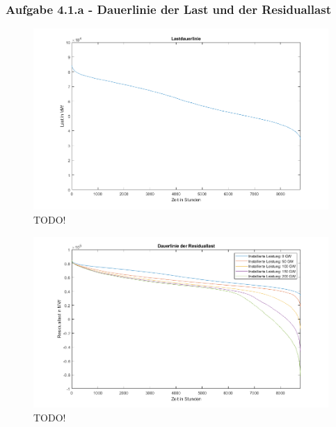 \documentclass[a4paper,12pt]{article}
\begin{document}
	\subsubsection{Aufgabe 4.1.a - Dauerlinie der Last und der Residuallast}
	\begin{figure}[H]
		\centering
		\includegraphics[width=12cm]{img/results/Lastdauerlinie}
		\caption{TODO!}
	\end{figure}
	\begin{figure}[H]
		\centering
		\includegraphics[width=12cm]{img/results/DauerlinieResiduallast}
		\caption{TODO!}
	\end{figure}
\end{document}
